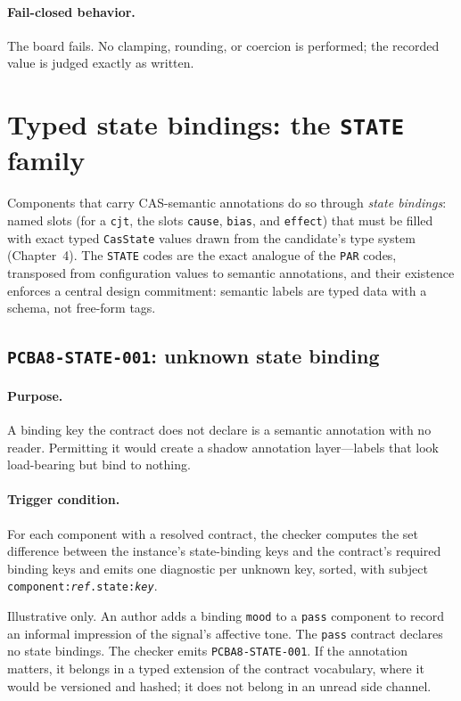 \paragraph{Fail-closed behavior.} The board fails. No clamping, rounding, or coercion is performed; the recorded value is judged exactly as written.

\section{Typed state bindings: the \texttt{STATE} family}\label{ch07:sec:state}

Components that carry CAS-semantic annotations do so through \emph{state bindings}: named slots (for a \texttt{cjt}, the slots \texttt{cause}, \texttt{bias}, and \texttt{effect}) that must be filled with exact typed \texttt{CasState} values drawn from the candidate's type system (Chapter~4). The \texttt{STATE} codes are the exact analogue of the \texttt{PAR} codes, transposed from configuration values to semantic annotations, and their existence enforces a central design commitment: semantic labels are typed data with a schema, not free-form tags.

\subsection{\texttt{PCBA8-STATE-001}: unknown state binding}\label{ch07:sub:state001}

\paragraph{Purpose.} A binding key the contract does not declare is a semantic annotation with no reader. Permitting it would create a shadow annotation layer---labels that look load-bearing but bind to nothing.

\paragraph{Trigger condition.} For each component with a resolved contract, the checker computes the set difference between the instance's state-binding keys and the contract's required binding keys and emits one diagnostic per unknown key, sorted, with subject \texttt{component:\emph{ref}.state:\emph{key}}.

\begin{example}\label{ch07:ex:state001}
Illustrative only. An author adds a binding \texttt{mood} to a \texttt{pass} component to record an informal impression of the signal's affective tone. The \texttt{pass} contract declares no state bindings. The checker emits \texttt{PCBA8-STATE-001}. If the annotation matters, it belongs in a typed extension of the contract vocabulary, where it would be versioned and hashed; it does not belong in an unread side channel.
\end{example}

